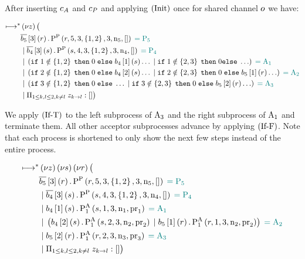 After inserting $c_A$ and $c_P$ and applying $\left(\operatorname{Init}\right)$ once for shared channel $o$ we have:

\begin{align*}
\longmapsto^*& \left(\nu z\right)\big (\\
&\overline{b_{5}}\left[3\right]\left(r\right).\operatorname{P^{P}_{}}\left(r, 5, 3, \left\{1, 2\right\}, 3, \operatorname{n}_5, \mathtt{[]}\right) \;\textcolor{teal}{= \operatorname{P_{5}}}\\
&\; | \; \overline{b_{4}}\left[3\right]\left(s\right).\operatorname{P^{P}_{}}\left(s, 4, 3, \left\{1, 2\right\}, 3, \operatorname{n}_4, \mathtt{[]}\right) \;\textcolor{teal}{= \operatorname{P_{4}}}\\
&\; | \; \left(
    \mathtt{if}\; 1 \notin \left\{1, 2\right\}
    \;\mathtt{then}\; 0
    \;\mathtt{else}\; b_{4}\left[1\right]\left(s\right)\ldots
    \; | \;
    \mathtt{if}\; 1 \notin \left\{2, 3\right\}
    \;\mathtt{then}\; 0
    \mathtt{else}\; \ldots
\right) \;\textcolor{teal}{= \operatorname{A_{1}}}\\
&\; | \; \left(
    \mathtt{if}\; 2 \notin \left\{1, 2\right\}
    \;\mathtt{then}\; 0
    \;\mathtt{else}\; b_{4}\left[2\right]\left(s\right)\ldots
    \; | \;
    \mathtt{if}\; 2 \notin \left\{2, 3\right\}
    \;\mathtt{then}\; 0
    \;\mathtt{else}\; b_{5}\left[1\right]\left(r\right)\ldots
\right) \;\textcolor{teal}{= \operatorname{A_{2}}}\\
&\; | \; \left(
    \mathtt{if}\; 3 \notin \left\{1, 2\right\}
    \;\mathtt{then}\; 0
    \;\mathtt{else}\; \ldots
    \; | \;
    \mathtt{if}\; 3 \notin \left\{2, 3\right\}
    \;\mathtt{then}\; 0
    \;\mathtt{else}\; b_{5}\left[2\right]\left(r\right)\ldots
\right) \;\textcolor{teal}{= \operatorname{A_{3}}}\\
&\; | \; \Pi_{1 \le k,l \le 2, k \neq l}\; z_{k\to l}:[]
\big )
\end{align*}

We apply $\left(\operatorname{If-T}\right)$ to the left subprocess of $\operatorname{A_{3}}$ and the right subprocess of $\operatorname{A_{1}}$ and terminate them.
All other acceptor subprocesses advance by applying $\left(\operatorname{If-F}\right)$.
Note that each process is shortened to only show the next few steps instead of the entire process.

\begin{align*}
\longmapsto^*& \left(\nu z\right)\left(\nu s\right)\left(\nu r\right) \big (\\
&\overline{b_{5}}\left[3\right]\left(r\right).\operatorname{P^{P}_{}}\left(r, 5, 3, \left\{1, 2\right\}, 3, \operatorname{n}_5, \mathtt{[]}\right) \;\textcolor{teal}{= \operatorname{P_{5}}}\\
&\; | \; \overline{b_{4}}\left[3\right]\left(s\right).\operatorname{P^{P}_{}}\left(s, 4, 3, \left\{1, 2\right\}, 3, \operatorname{n}_4, \mathtt{[]}\right) \;\textcolor{teal}{= \operatorname{P_{4}}}\\
&\; | \; b_{4}\left[1\right]\left(s\right) . \operatorname{P^{A}_{1}}\left(s, 1, 3, \operatorname{n}_1, \operatorname{pr}_1\right) \;\textcolor{teal}{= \operatorname{A_{1}}}\\
&\; | \; \left(
    b_{4}\left[2\right]\left(s\right) . \operatorname{P^{A}_{1}}\left(s, 2, 3, \operatorname{n}_2, \operatorname{pr}_2\right)
    \; | \;
    b_{5}\left[1\right]\left(r\right) . \operatorname{P^{A}_{1}}\left(r, 1, 3, \operatorname{n}_2, \operatorname{pr}_2\right)
\right) \;\textcolor{teal}{= \operatorname{A_{2}}}\\
&\; | \; b_{5}\left[2\right]\left(r\right) . \operatorname{P^{A}_{1}}\left(r, 2, 3, \operatorname{n}_3, \operatorname{pr}_3\right) \;\textcolor{teal}{= \operatorname{A_{3}}}\\
&\; | \; \Pi_{1 \le k,l \le 2, k \neq l}\; z_{k\to l}:[]
\big )
\end{align*}


